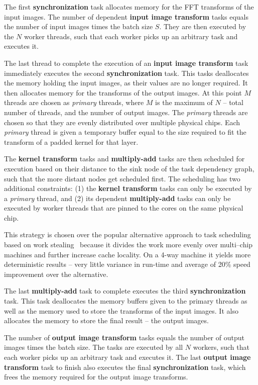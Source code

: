 \documentclass[conference]{./IEEEtran}
\begin{document}
  The first {\bf synchronization} task allocates memory for the FFT
  transforms of the input images.  The number of dependent {\bf input
    image transform} tasks equals the number of input images times the
  batch size $S$.  They are then executed by the $N$ worker threads,
  such that each worker picks up an arbitrary task and executes it.

  The last thread to complete the execution of an {\bf input image
    transform} task immediately executes the second {\bf
    synchronization} task.  This tasks deallocates the memory holding
  the input images, as their values are no longer required. It then
  allocates memory for the transforms of the output images.  At this
  point $M$ threads are chosen as \emph{primary} threads, where $M$ is
  the maximum of $N$ -- total number of threads, and the number of
  output images.  The \emph{primary} threads are chosen so that they
  are evenly distributed over multiple physical chips.  Each
  \emph{primary} thread is given a temporary buffer equal to the size
  required to fit the transform of a padded kernel for that layer.

  The {\bf kernel transform} tasks and {\bf multiply-add} tasks are
  then scheduled for execution based on their distance to the sink
  node of the task dependency graph, such that the more distant nodes
  get scheduled first.  The scheduling has two additional constraints:
  (1) the {\bf kernel transform} tasks can only be executed by a
  \emph{primary} thread, and (2) its dependent {\bf multiply-add}
  tasks can only be executed by worker threads that are pinned to the
  cores on the same physical chip.

  This strategy is chosen over the popular alternative approach to
  task scheduling based on work stealing~\cite{reinders2007intel,
    willhalm2008putting} because it divides the work more evenly over
  multi--chip machines and further increase cache locality.  On a
  4-way machine it yields more deterministic results -- very little
  variance in run-time and average of 20\% speed improvement over the
  alternative.

  The last {\bf multiply-add} task to complete executes the third {\bf
    synchronization} task.  This task deallocates the memory buffers
  given to the primary threads as well as the memory used to store the
  transforms of the input images.  It also allocates the memory to
  store the final result -- the output images.

  The number of {\bf output image transform} tasks equals the number
  of output images times the batch size.  The tasks are executed by
  all $N$ workers, such that each worker picks up an arbitrary task
  and executes it.  The last {\bf output image transform} task to
  finish also executes the final {\bf synchronization} task, which
  frees the memory required for the output image transforms.
\end{document}
